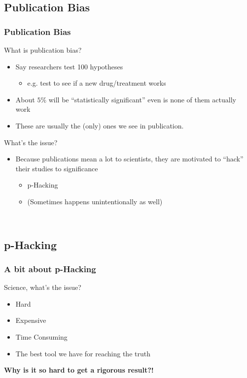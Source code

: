\documentclass{beamer} %
\newcommand{\1}{\mathbb{1}}
\begin{document}
\subsection{Publication Bias}

\begin{frame}[t]\frametitle{Publication Bias}

What is publication bias?
\vspace{3mm}
\begin{itemize}
	\item Say researchers test 100 hypotheses
	\begin{itemize}
		\item[] e.g. test to see if a new drug/treatment works
	\end{itemize}
	\item About $5\%$ will be ``statistically significant'' even is none of them actually work
	\item These are usually the (only) ones we see in publication.
\end{itemize}
\pause
What's the issue? 
\pause
\begin{itemize}
	\item Because publications mean a lot to scientists, they are motivated to ``hack'' their studies to significance
	\pause
	\begin{itemize}
		\item p-Hacking
		\item (Sometimes happens unintentionally as well)
	\end{itemize}
\end{itemize}

\href{http://marginalrevolution.com/marginalrevolution/2016/07/results-free-review.html}
{}\\	
\end{frame}


\subsection{p-Hacking}

\begin{frame}[t]\frametitle{A bit about p-Hacking}

Science, what's the issue?  \pause
\begin{itemize}
	\item Hard 
	\item Expensive 
	\item Time Consuming \pause
	\item The best tool we have for reaching the truth 
\end{itemize}
\vspace{3mm}
{\bf{Why is it so hard to get a rigorous result?!}}
\vspace{3mm}

\href{http://fivethirtyeight.com/features/science-isnt-broken/}
{}\\	
\end{frame}
\end{document}
